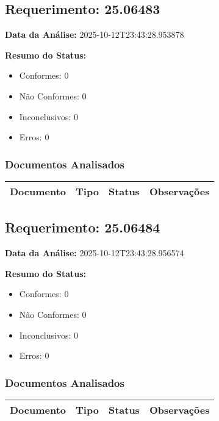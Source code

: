 \documentclass[12pt,a4paper]{article}
\begin{document}
\subsection{Requerimento: 25.06483}

\textbf{Data da Análise:} 2025-10-12T23:43:28.953878

\textbf{Resumo do Status:}
\begin{itemize}
    \item Conformes: 0
    \item Não Conformes: 0
    \item Inconclusivos: 0
    \item Erros: 0
\end{itemize}

\subsubsection{Documentos Analisados}

\begin{longtable}{|p{4cm}|p{2cm}|p{2cm}|p{6cm}|}
\hline
\textbf{Documento} & \textbf{Tipo} & \textbf{Status} & \textbf{Observações} \\
\hline
\endhead
\end{longtable}


\subsection{Requerimento: 25.06484}

\textbf{Data da Análise:} 2025-10-12T23:43:28.956574

\textbf{Resumo do Status:}
\begin{itemize}
    \item Conformes: 0
    \item Não Conformes: 0
    \item Inconclusivos: 0
    \item Erros: 0
\end{itemize}

\subsubsection{Documentos Analisados}

\begin{longtable}{|p{4cm}|p{2cm}|p{2cm}|p{6cm}|}
\hline
\textbf{Documento} & \textbf{Tipo} & \textbf{Status} & \textbf{Observações} \\
\hline
\endhead
\end{longtable}
\end{document}
